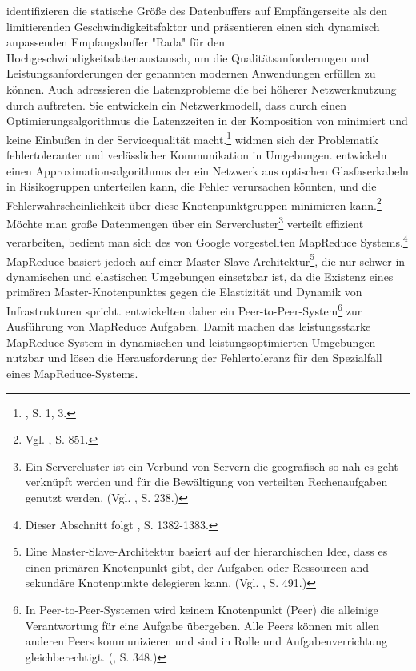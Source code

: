 \cite{Liu.2012} identifizieren die statische Größe des Datenbuffers auf Empfängerseite als den limitierenden Geschwindigkeitsfaktor und präsentieren einen sich dynamisch anpassenden Empfangsbuffer "Rada" für den Hochgeschwindigkeitsdatenaustausch, um die Qualitätsanforderungen und Leistungsanforderungen der genannten modernen Anwendungen erfüllen zu können.
\newline
Auch \cite{Klein.2013} adressieren die Latenzprobleme die bei höherer Netzwerknutzung durch \CC auftreten. Sie entwickeln ein Netzwerkmodell, dass durch einen Optimierungsalgorithmus die Latenzzeiten in der Komposition von \CSs minimiert und keine Einbußen in der Servicequalität macht.\footnote{\cite{Klein.2013}, S. 1, 3.}
\newline
\cite{Zhu.2012} widmen sich der Problematik fehlertoleranter und verlässlicher Kommunikation in \CC Umgebungen.
\cite{Zhu.2012} entwickeln einen Approximationsalgorithmus der ein Netzwerk aus optischen Glasfaserkabeln in Risikogruppen unterteilen kann, die Fehler verursachen könnten, und die Fehlerwahrscheinlichkeit über diese Knotenpunktgruppen minimieren kann.\footnote{Vgl. \cite{Zhu.2012}, S. 851.}
\newline
Möchte man große Datenmengen über ein Servercluster\footnote{Ein Servercluster ist ein Verbund von Servern die geografisch so nah es geht verknüpft werden und für die Bewältigung von verteilten Rechenaufgaben genutzt werden. (Vgl. \cite{Laudon.2010}, S. 238.)} verteilt effizient verarbeiten, bedient man sich des von Google vorgestellten MapReduce Systems.\footnote{Dieser Abschnitt folgt \cite{Marozzo.2012}, S. 1382-1383.}
MapReduce basiert jedoch auf einer Master-Slave-Architektur\footnote{Eine Master-Slave-Architektur basiert auf der hierarchischen Idee, dass es einen primären Knotenpunkt gibt, der Aufgaben oder Ressourcen and sekundäre Knotenpunkte delegieren kann. (Vgl. \cite{Sommerville.2012}, S. 491.)}, die nur schwer in dynamischen und elastischen \CC Umgebungen einsetzbar ist, da die Existenz eines primären Master-Knotenpunktes gegen die Elastizität und Dynamik von \CC Infrastrukturen spricht.
\cite{Marozzo.2012} entwickelten daher ein Peer-to-Peer-System\footnote{In Peer-to-Peer-Systemen wird keinem Knotenpunkt (Peer) die alleinige Verantwortung für eine Aufgabe übergeben. Alle Peers können mit allen anderen Peers kommunizieren und sind in Rolle und Aufgabenverrichtung gleichberechtigt. (\cite{Laudon.2010}, S. 348.)} zur Ausführung von MapReduce Aufgaben.
Damit machen \cite{Marozzo.2012} das leistungsstarke MapReduce System in dynamischen und leistungsoptimierten \CC Umgebungen nutzbar und lösen die Herausforderung der Fehlertoleranz für den Spezialfall eines MapReduce-Systems.
